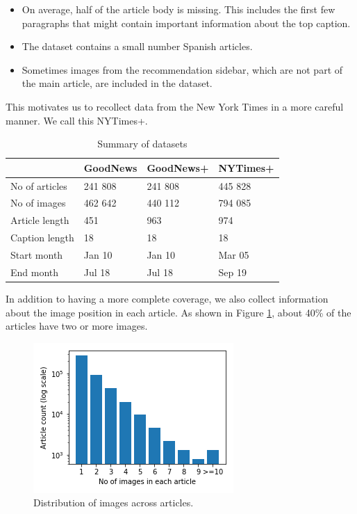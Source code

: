 \documentclass[10pt,twocolumn,letterpaper]{article}
\begin{document}
\begin{itemize}
   \item On average, half of the article body is missing. This includes
         the first few paragraphs that might contain important information
         about the top caption.
   \item The dataset contains a small number Spanish articles.
   \item Sometimes images from the recommendation sidebar, which are not part
         of the main article, are included in the dataset.
\end{itemize}

This motivates us to recollect data from the New York Times in a more careful
manner. We call this NYTimes+.

\begin{table}[t]
	\caption {Summary of datasets}
	\label{tab:datasets}
	\centering
	\begin{tabular}{llll}
		\toprule
		  & GoodNews  & GoodNews+ &   NYTimes+ \\
		\midrule
      No of articles & 241 808 & 241 808 & 445 828 \\
      No of images   & 462 642 & 440 112 & 794 085 \\
      Article length & 451 & 963 & 974 \\
      Caption length & 18 & 18 & 18 \\
      Start month & Jan 10 & Jan 10 & Mar 05\\
      End month & Jul 18 & Jul 18 & Sep 19 \\
		\bottomrule
	\end{tabular}
\end{table}

In addition to having a more complete coverage, we also collect information
about the image position in each article. As shown in Figure \ref{fig:dist},
about 40\% of the articles have two or more images.

\begin{figure}[h]
   \begin{center}
   \includegraphics[width=0.8\linewidth]{figures/caption_dist.png}
   \end{center}
      \caption{Distribution of images across articles.}
   \label{fig:dist}
   \end{figure}
\end{document}
